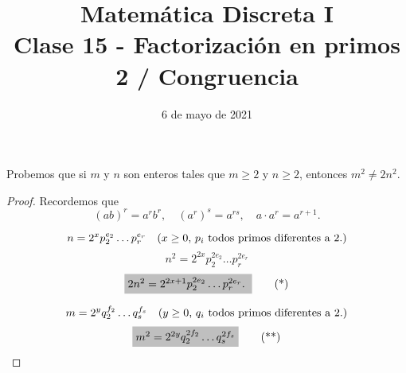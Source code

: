 \documentclass[handout]{beamer} %
\title[Clase 15 - Factorización en primos]{Matemática Discreta I \\ Clase 15 - Factorización en primos 2 / Congruencia}
\institute[]{\normalsize FAMAF / UNC
    \\[\baselineskip] ${}^{}$
    \\[\baselineskip]
}
\date[06/05/2021]{6 de mayo de 2021}
\begin{document}
    
    \frame{\titlepage} 
    
    
    \begin{frame}
        
        \begin{ejemplo} Probemos que si $m$ y $n$ son enteros tales que
            $m\ge 2$ y $n\ge 2$, entonces $m^2 \not=2n^2$.
        \end{ejemplo}\pause
        \begin{proof} \pause

        Recordemos que
        $$
        (ab)^r = a^rb^r, \quad (a^r)^s = a^{r s}, \quad  a\cdot a^r = a^{r+1}. 
        $$    


            $$ n = 2^{x}p_2^{e_2}\ldots p_r^{e_r}\text{\quad ($x \ge 0$, $p_i$ todos primos diferentes a 2.)} $$
            $$ n^2 = 2^{2x}p_2^{2e_2}\ldots p_r^{2e_r}$$
            \begin{equation}
                \colorbox{lightgray}{$2n^2= 2^{2x+1}p_2^{2e_2}\ldots p_r^{2e_r}.$ }\tag{*}
            \end{equation}
            
            $$
            m = 2^{y}q_2^{f_2}\ldots q_s^{f_s}\text{\quad ($y \ge 0$, $q_i$ todos primos diferentes a 2.)}
            $$
            \begin{equation}
                \colorbox{lightgray}{$m^2 = 2^{2y}q_2^{2f_2}\ldots q_s^{2f_s}$} \tag{**}
            \end{equation}
            
        \end{proof}
        
    \end{frame}
    
\end{document}
